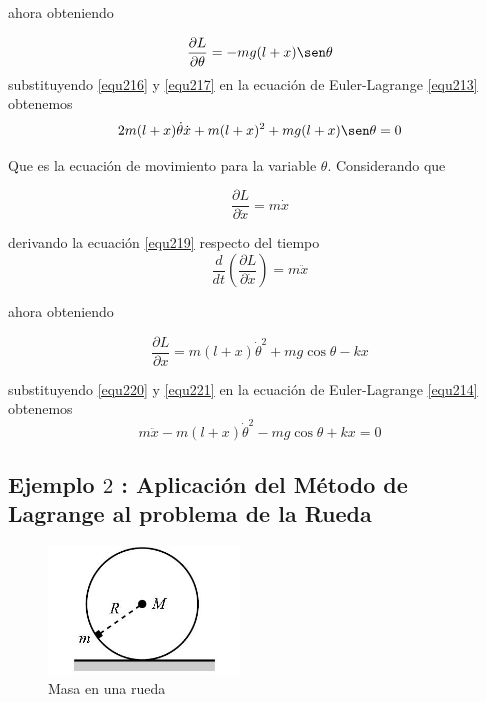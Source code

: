 \documentclass[12pt]{book}
\theoremstyle{definition}
\theoremstyle{remark}
\theoremstyle{plain}
\begin{document}
ahora obteniendo

\begin{equation}
\label{equ217}
 \frac{\partial L}{\partial \theta}=-m g (l+x) \sen \theta
\end{equation}
 substituyendo \ref{equ216} y \ref{equ217} en la ecuación de Euler-Lagrange \ref{equ213} obtenemos
\begin{equation}
\label{equ218}
 2 m (l+x) \dot{\theta} \dot{x} + m (l+x)^2+m g (l+x) \sen \theta=0
\end{equation}

Que es la ecuación de movimiento para la variable $\theta$. Considerando que

\begin{equation}
\label{equ219}
\frac{\partial L}{\partial \dot{x}}=m \dot{x}
\end{equation}

derivando la ecuación \ref{equ219} respecto del tiempo 
\begin{equation}
\label{equ220}
\frac{d}{d t} \left ( \frac{\partial L}{\partial \dot{x}} \right )=m \ddot{x}
\end{equation}

ahora obteniendo

\begin{equation}
\label{equ221}
 \frac{\partial L}{\partial x}=m (l+x) \dot{\theta}^2+m g \cos \theta - k x
\end{equation}

 substituyendo \ref{equ220} y \ref{equ221} en la ecuación de Euler-Lagrange \ref{equ214} obtenemos
\begin{equation}
\label{equ222}
m  \ddot{x} - m (l+x) \dot{\theta}^2-m g \cos \theta + k x=0
\end{equation}

\subsection{Ejemplo $2$ : Aplicación del Método de Lagrange al problema de la Rueda }

\begin{figure}
\centering
\includegraphics[width=2in]{rueda.jpeg}
\caption{Masa en una rueda}
\label{fig11}
\end{figure}
\end{document}
